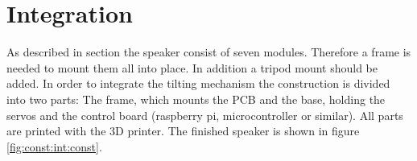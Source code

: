 \section{Integration}


As described in section  the speaker consist of seven modules. Therefore a frame is needed to mount them all into place. In addition a tripod mount should be added. In order to integrate the tilting mechanism the construction is divided into two parts: The frame, which mounts the PCB and the base, holding the servos and the control board (raspberry pi, microcontroller or similar). All parts are printed with the 3D printer. The finished speaker is shown in figure \ref{fig:const:int:const}.
%

